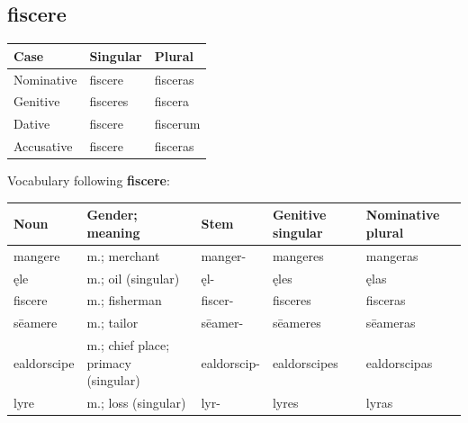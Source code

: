 \subsection*{fiscere}

\par\begingroup
\fontsize{10.5}{13.2}\selectfont
\setlength{\LTleft}{0pt}\setlength{\LTright}{\fill}
\noindent
\begin{tabular}{@{}>{\raggedright\arraybackslash}p{39.46mm}>{\raggedright\arraybackslash}p{39.46mm}>{\raggedright\arraybackslash}p{39.46mm}@{}}
\toprule
\textbf{Case} & \textbf{Singular} & \textbf{Plural} \\
\midrule
Nominative & fiscere & fisceras \\
Genitive & fisceres & fiscera \\
Dative & fiscere & fiscerum \\
Accusative & fiscere & fisceras \\
\bottomrule
\end{tabular}
\par\endgroup

Vocabulary following \textbf{fiscere}:

\par\begingroup
\fontsize{10.5}{13.2}\selectfont
\setlength{\LTleft}{0pt}\setlength{\LTright}{\fill}
\noindent
\begin{tabular}{@{}>{\raggedright\arraybackslash}p{19.5mm}>{\raggedright\arraybackslash}p{29.97mm}>{\raggedright\arraybackslash}p{18.5mm}>{\raggedright\arraybackslash}p{22.39mm}>{\raggedright\arraybackslash}p{22.39mm}@{}}
\toprule
\textbf{Noun} & \textbf{Gender; meaning} & \textbf{Stem} & \textbf{Genitive singular} & \textbf{Nominative plural} \\
\midrule
mangere & m.; merchant & manger- & mangeres & mangeras \\
ęle & m.; oil (singular) & ęl- & ęles & ęlas \\
fiscere & m.; fisherman & fiscer- & fisceres & fisceras \\
sēamere & m.; tailor & sēamer- & sēameres & sēameras \\
ealdorscipe & m.; chief place; primacy (singular) & ealdorscip- & ealdorscipes & ealdorscipas \\
lyre & m.; loss (singular) & lyr- & lyres & lyras \\
\bottomrule
\end{tabular}
\par\endgroup

